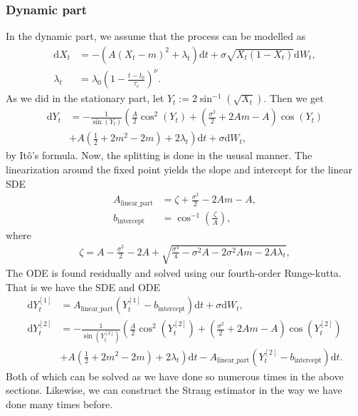 \subsubsection{Dynamic part}
In the dynamic part, we assume that the process can be modelled as
\begin{align}
    \mathrm{d}X_t &= -\left(A(X_t - m)^2 + \lambda_t\right)\mathrm{d}t + \sigma \sqrt{X_t\left(1 - X_t\right)}\mathrm{d}W_t,\\
    \lambda_t &= \lambda_0 \left(1 - \frac{t - t_0}{\tau_c}\right)^\nu.
\end{align}
As we did in the stationary part, let $Y_t := 2 \sin^{-1}\left(\sqrt{X_t}\right)$. Then we get 
\begin{align}
    \mathrm{d}Y_t &= - \frac{1}{\sin(Y_t)}\left(\frac{A}{2}\cos^2(Y_t) + \left(\frac{\sigma^2}{2} + 2 Am - A\right)\cos(Y_t) \right. \nonumber \\
    &+ \left. A \left(\frac{1}{2} + 2m^2 - 2m\right) + 2\lambda_t\right)\mathrm{d}t + \sigma \mathrm{d}W_t,
\end{align}
by Itô's formula. Now, the splitting is done in the ususal manner. The linearization around the fixed point yields the slope and intercept for the linear SDE
\begin{align}
    A_{\mathrm{linear\_part}} &= \zeta + \frac{\sigma^2}{2} - 2 Am - A,\\
    b_{\mathrm{intercept}} &= \cos^{-1}\left(\frac{\zeta}{A}\right),
\end{align}
where 
\begin{align}
    \zeta = A - \frac{\sigma^2}{2} - 2 A + \sqrt{\frac{\sigma^4}{4} - \sigma^2 A - 2 \sigma^2 A m - 2 A \lambda_t},
\end{align}
The ODE is found residually and solved using our fourth-order Runge-kutta. That is we have the SDE and ODE
\begin{align}
    \mathrm{d}Y_t^{[1]} &= A_{\mathrm{linear\_part}}\left(Y_t^{[1]} -  b_{\mathrm{intercept}}\right)\mathrm{d}t + \sigma \mathrm{d}W_t,\\
    \mathrm{d}Y_t^{[2]} &=- \frac{1}{\sin(Y_t^{[2]})}\left(\frac{A}{2}\cos^2(Y_t^{[2]}) + \left(\frac{\sigma^2}{2} + 2 Am - A\right)\cos(Y_t^{[2]}) \right. \nonumber \\
    &+ \left. A \left(\frac{1}{2} + 2m^2 - 2m\right) + 2\lambda_t\right) \mathrm{d}t - A_{\mathrm{linear\_part}}\left(Y_t^{[2]} -  b_{\mathrm{intercept}}\right)\mathrm{d}t  \label{eq:dynamicjacobiODE}.
\end{align}
Both of which can be solved as we have done so numerous times in the above sections. Likewise, we can construct the Strang estimator in the way we have done many times before.
